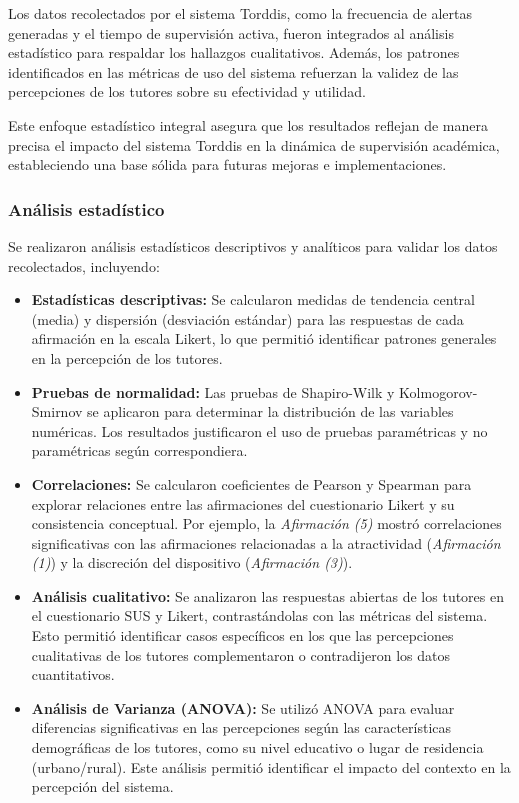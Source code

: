 \documentclass[a4paper,fleqn]{cas-sc}
\begin{document}
				Los datos recolectados por el sistema Torddis, como la frecuencia de alertas generadas y el tiempo de supervisión activa, fueron integrados al análisis estadístico para respaldar los hallazgos cualitativos. Además, los patrones identificados en las métricas de uso del sistema refuerzan la validez de las percepciones de los tutores sobre su efectividad y utilidad.
				
				Este enfoque estadístico integral asegura que los resultados reflejan de manera precisa el impacto del sistema Torddis en la dinámica de supervisión académica, estableciendo una base sólida para futuras mejoras e implementaciones.
				
			\subsubsection{Análisis estadístico}
				Se realizaron análisis estadísticos descriptivos y analíticos para validar los datos recolectados, incluyendo:
				\begin{itemize}
					\item \textbf{Estadísticas descriptivas:}
						Se calcularon medidas de tendencia central (media) y dispersión (desviación estándar) para las respuestas de cada afirmación en la escala Likert, lo que permitió identificar patrones generales en la percepción de los tutores.
					\item \textbf{Pruebas de normalidad:}
						Las pruebas de Shapiro-Wilk y Kolmogorov-Smirnov se aplicaron para determinar la distribución de las variables numéricas. Los resultados justificaron el uso de pruebas paramétricas y no paramétricas según correspondiera.
					\item \textbf{Correlaciones:}
						Se calcularon coeficientes de Pearson y Spearman para explorar relaciones entre las afirmaciones del cuestionario Likert y su consistencia conceptual. Por ejemplo, la \textit{Afirmación (5)} mostró correlaciones significativas con las afirmaciones relacionadas a la atractividad (\textit{Afirmación (1)}) y la discreción del dispositivo (\textit{Afirmación (3)}).
					\item \textbf{Análisis cualitativo:}
						Se analizaron las respuestas abiertas de los tutores en el cuestionario SUS y Likert, contrastándolas con las métricas del sistema. Esto permitió identificar casos específicos en los que las percepciones cualitativas de los tutores complementaron o contradijeron los datos cuantitativos.
					\item \textbf{Análisis de Varianza (ANOVA):}
						Se utilizó ANOVA para evaluar diferencias significativas en las percepciones según las características demográficas de los tutores, como su nivel educativo o lugar de residencia (urbano/rural). Este análisis permitió identificar el impacto del contexto en la percepción del sistema.
				\end{itemize}
				
\end{document}
